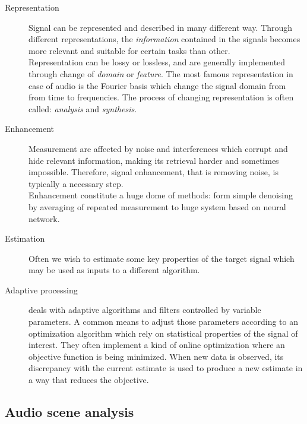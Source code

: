 \begin{description}
    \item[Representation] Signal can be represented and described in many different way.
    Through different representations, the \textit{information} contained in the signals becomes more relevant and suitable for certain tasks than other.
    \\Representation can be lossy or lossless, and are generally implemented through change of \textit{domain} or \textit{feature}.
    The most famous representation in case of audio is the Fourier basis which change the signal domain from from time to frequencies.
    The process of changing representation is often called: \textit{analysis} and \textit{synthesis}.

    \item[Enhancement] Measurement are affected by noise and interferences which corrupt and hide relevant information, making its retrieval harder and sometimes impossible.
    Therefore, signal enhancement, that is removing noise, is typically a necessary step.
    \\Enhancement constitute a huge dome of methods:
    form simple denoising by averaging of repeated measurement to huge system based on neural network.

    \item[Estimation] Often we wish to estimate some key properties of the target signal which may be used as inputs to a different algorithm.

    \item[Adaptive processing] deals with adaptive algorithms and filters controlled by variable parameters.
    A common means to adjust those parameters according to an optimization algorithm which rely on statistical properties of the signal of interest.
    They often implement a kind of online optimization where an objective function is being minimized.
    When new data is observed, its discrepancy with the current estimate is used to produce a new estimate in a way that reduces the objective.
\end{description}

\subsection{Audio scene analysis}



